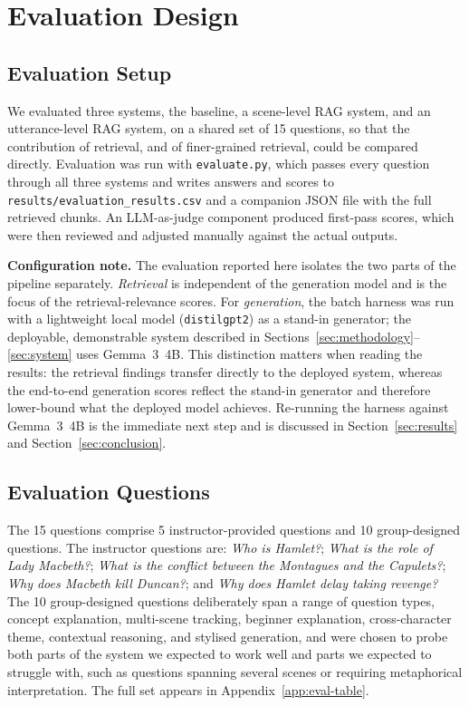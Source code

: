 \section{Evaluation Design}
\label{sec:evaluation}

\subsection{Evaluation Setup}
We evaluated three systems, the baseline, a scene-level RAG system, and
an utterance-level RAG system, on a shared set of 15 questions, so that
the contribution of retrieval, and of finer-grained retrieval, could be
compared directly. Evaluation was run with \texttt{evaluate.py}, which
passes every question through all three systems and writes answers and
scores to \texttt{results/evaluation\_results.csv} and a companion JSON
file with the full retrieved chunks. An LLM-as-judge component produced
first-pass scores, which were then reviewed and adjusted manually against
the actual outputs.

\textbf{Configuration note.} The evaluation reported here isolates the
two parts of the pipeline separately. \emph{Retrieval} is independent of
the generation model and is the focus of the retrieval-relevance scores.
For \emph{generation}, the batch harness was run with a lightweight local
model (\texttt{distilgpt2}) as a stand-in generator; the deployable,
demonstrable system described in
Sections~\ref{sec:methodology}--\ref{sec:system} uses Gemma~3~4B. This
distinction matters when reading the results: the retrieval findings
transfer directly to the deployed system, whereas the end-to-end
generation scores reflect the stand-in generator and therefore lower-bound
what the deployed model achieves. Re-running the harness against Gemma~3~4B
is the immediate next step and is discussed in
Section~\ref{sec:results} and Section~\ref{sec:conclusion}.

\subsection{Evaluation Questions}
The 15 questions comprise 5 instructor-provided questions and 10
group-designed questions. The instructor questions are: \emph{Who is
Hamlet?}; \emph{What is the role of Lady Macbeth?}; \emph{What is the
conflict between the Montagues and the Capulets?}; \emph{Why does Macbeth
kill Duncan?}; and \emph{Why does Hamlet delay taking revenge?} The 10
group-designed questions deliberately span a range of question types,
concept explanation, multi-scene tracking, beginner explanation,
cross-character theme, contextual reasoning, and stylised generation, and
were chosen to probe both parts of the system we expected to work well
and parts we expected to struggle with, such as questions spanning
several scenes or requiring metaphorical interpretation. The full set
appears in Appendix~\ref{app:eval-table}.

